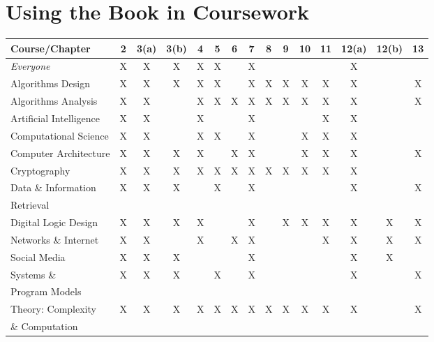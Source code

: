 \documentclass{article}
\begin{document}
\section*{Using the Book in Coursework}

\bigskip

\begin{tabular}{|l||c|c|c|c|c|c|c|c|c|c|c|c|c|c|}
\hline
{\bf Course}/{\bf Chapter}
   & 2 & 3(a) & 3(b) & 4 & 5 & 6 & 7 & 8 & 9 & 10 & 11 & 12(a) & 12(b) & 13 \\
\hline
\hline
{\em Everyone} 
   & X & X & X & X & X &  & X &  &  &  &  & X & &  \\
\hline
Algorithms Design
   & X & X & X & X & X &  & X & X & X & X & X & X & & X \\
\hline
Algorithms Analysis
   & X & X & & X & X & X & X & X & X & X & X & X & & X \\
   \hline
Artificial Intelligence
   & X & X & & X &  &  & X &  &  &  & X & X & &  \\
   \hline
Computational Science
   & X & X & & X & X &  & X &  &  & X & X & X &  &  \\
\hline
Computer Architecture 
   & X & X & X & X &  & X & X &  &  & X & X & X & & X \\
\hline
Cryptography 
   & X & X & X & X & X & X & X & X & X & X & X & X & &  \\
\hline
Data \& Information 
   & X & X & X & & X &  & X &  &  &  &  & X & & X \\
Retrieval
    &  &  &  &  &  &  &  &  &  &  &  &  & & \\
\hline
Digital Logic Design 
   & X & X & X & X &  &  & X &  & X & X & X & X & X & X \\
\hline
Networks \& Internet
   & X & X & & X &  & X & X &  &  &  & X & X & X & X \\
\hline
Social Media 
   & X & X & X &  &  &  & X &  &  &  &  & X & X &  \\
\hline
Systems \&     
  & X & X & X &  & X &  & X &  &  &  &  & X & & X \\
Program Models &  & &  &  &  &  &  &  &  &  &  &  & & \\ 
\hline
Theory: Complexity 
   & X & X & X & X & X & X & X & X & X & X & X & X & & X \\
\& Computation    &  &  & &  &  &  &  &  &  &  &  &  & & \\
\hline
\end{tabular}
\bigskip
\end{document}
